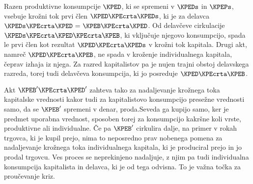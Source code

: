 \documentclass[kapital_02.tex]{subfiles}
\begin{document}
Razen produktivne konsumpcije \( \KPED \), ki se spremeni v \( \KPEDs \) in \( \KPEPs \), vsebuje krožni tok prvi člen \( \KPED \KPEcrta \KPEDs \), ki je za delavca \( \KPEDs \KPEcrta \KPED \textrm{ = } \KPEB \KPEcrta \KPED \). Od delavčeve cirkulacije \( \KPEDs \KPEcrta \KPED \KPEcrta \KPEB \), ki vključuje njegovo konsumpcijo, spada le prvi člen kot rezultat \( \KPED \KPEcrta \KPEDs \) v krožni tok kapitala. Drugi akt, namreč \( \KPED \KPEcrta \KPEB \), ne spada v kroženje individualnega kapitala, čeprav izhaja iz njega. Za razred kapitalistov pa je nujen trajni obstoj delavskega razreda, torej tudi delavčeva konsumpcija, ki jo posreduje \( \KPED \KPEcrta \KPEB \).

Akt \( \KPEB' \KPEcrta \KPED' \) zahteva tako za nadaljevanje krožnega toka kapitalske vrednosti kakor tudi za kapitalistovo konsumpcijo presežne vrednosti samo, da se \( \KPEB' \) spremeni v denar, proda.\KPEstran Seveda ga kupijo samo, ker je predmet uporabna vrednost, sposoben torej za konsumpcijo kakršne koli vrste, produktivne ali individualne. Če pa \( \KPEB' \) cirkulira dalje, na primer v rokah trgovca, ki je kupil prejo, nima to neposredno prav nobenega pomena za nadaljevanje krožnega toka individualnega kapitala, ki je produciral prejo in jo prodal trgovcu. Ves proces se neprekinjeno nadaljuje, z njim pa tudi individualna konsumpcija kapitalista in delavca, ki je od tega odvisna. To je važna točka za proučevanje kriz.
\end{document}
